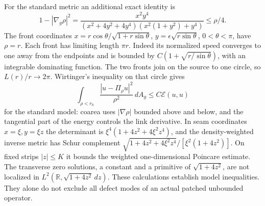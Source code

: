 \documentclass[11pt]{article}
\theoremstyle{readable}
\theoremstyle{remark}\newtheorem{remark}[theorem]{Remark}
\newcommand{\R}{\mathbb R}\newcommand{\C}{\mathbb C}\newcommand{\Z}{\mathbb Z}
\newcommand{\dd}{\,d}\newcommand{\norm}[1]{\left\lVert#1\right\rVert}
\begin{document}
For the standard metric an additional exact identity is
\[
 1-|\nabla_g\rho|^2
 =\frac{x^2y^4}{(x^2+4y^2+4y^4)(x^2(1+y^2)+y^4)}\leq\rho/4.
\]
The front coordinates
$x=r\cos\theta/\sqrt{1+r\sin\theta}$,
$y=\epsilon\sqrt{r\sin\theta}$, $0<\theta<\pi$, have $\rho=r$.
Each front has limiting length $\pi r$. Indeed its normalized speed
converges to one away from the endpoints and is bounded by
$C(1+\sqrt{r/\sin\theta})$, with an integrable dominating function.
The two fronts join on the source to one circle, so $L(r)/r\to2\pi$.
Wirtinger's inequality on that circle gives
\[
 \int_{\rho<r_0}\frac{|u-\Pi_\rho u|^2}{\rho^2}\dd A_g
 \leq C\mathcal E(u,u)
\]
for the standard model: coarea uses $|\nabla\rho|$ bounded above and below,
and the tangential part of the energy controls the link derivative.
In seam coordinates $x=\xi,y=\xi z$ the determinant is
$\xi^4(1+4z^2+4\xi^2z^4)$, and the density-weighted inverse metric has
Schur complement $\sqrt{1+4z^2+4\xi^2z^4}/[\xi^2(1+4z^2)]$.
On fixed strips $|z|\leq K$ it bounds the weighted one-dimensional
Poincare estimate. The transverse zero solutions, a constant and a
primitive of $\sqrt{1+4z^2}$, are not localized in
$L^2(\R,\sqrt{1+4z^2}\dd z)$.
These calculations establish model inequalities. They alone do not exclude
all defect modes of an actual patched unbounded operator.
\end{document}
